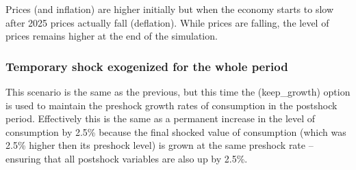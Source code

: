 \documentclass[letterpaper,10pt,english]{jupyterBook}
\begin{document}
\sphinxAtStartPar
Prices (and inflation) are higher initially but when the economy starts to slow after 2025 prices actually fall (deflation). While prices are falling, the level of prices remains higher at the end of the simulation.


\subsubsection{Temporary shock exogenized for the whole period}
\label{\detokenize{content/06_WBModels/ScenarioAnalysis:temporary-shock-exogenized-for-the-whole-period}}
\sphinxAtStartPar
This scenario is the same as the previous, but this time the  (keep\_growth) option is used to maintain the pre\sphinxhyphen{}shock growth rates of consumption in the post\sphinxhyphen{}shock period.  Effectively this is the same as a permanent increase in the level of consumption by 2.5\% because the final shocked value of consumption (which was 2.5\% higher then its pre\sphinxhyphen{}shock level) is grown at the same pre\sphinxhyphen{}shock rate – ensuring that all post\sphinxhyphen{}shock variables are also up by 2.5\%.
\end{document}
